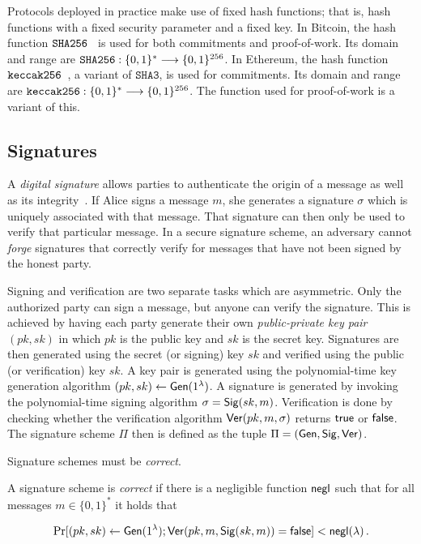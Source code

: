 Protocols deployed in practice make use of fixed hash functions; that is, hash
functions with a fixed security parameter and a fixed key. In Bitcoin, the hash
function $\mathtt{SHA256}$~\cite{sha256} is used for both commitments and proof-of-work.
Its domain and range are
$\mathtt{SHA256}: \{0, 1\}^* \longrightarrow \{0, 1\}^{256}$. In Ethereum, the hash
function $\mathtt{keccak256}$~\cite{bertoni2008indifferentiability}, a variant of
$\texttt{SHA3}$, is used for commitments. Its domain and range are $\mathtt{keccak256}: \{0, 1\}^*
\longrightarrow \{0, 1\}^{256}$. The function used for proof-of-work is a
variant of this.

\subsection{Signatures}
A \emph{digital signature} allows parties to authenticate the origin of a
message as well as its integrity~\cite{katz}. If Alice signs a message $m$, she generates a
signature $\sigma$ which is uniquely associated with that message. That
signature can then only be used to verify that particular message. In a secure signature scheme, an adversary
cannot \emph{forge} signatures that correctly verify for messages that have not
been signed by the honest party.

Signing and verification are two separate tasks which are asymmetric. Only the
authorized party can sign a message, but anyone can verify the signature. This
is achieved by having each party generate their own \emph{public-private
key pair} $(pk, sk)$ in which $pk$ is the public key and $sk$ is the secret key.
Signatures are then generated using the secret (or signing) key $sk$ and
verified using the public (or verification) key $sk$. A key pair is generated
using the polynomial-time key generation algorithm $(pk, sk) \gets
\mathsf{Gen}(1^\lambda)$. A signature is generated by invoking the polynomial-time
signing algorithm $\sigma = \mathsf{Sig}(sk, m)$. Verification is done by checking
whether the verification algorithm $\mathsf{Ver}(pk, m, \sigma)$ returns $\textsf{true}$ or
$\textsf{false}$. The signature scheme $\Pi$ then is defined as the tuple
$\Pi = (\mathsf{Gen}, \mathsf{Sig}, \mathsf{Ver})$.

Signature schemes must be \emph{correct}.

\begin{definition}
  A signature scheme is \emph{correct} if there is a
  negligible function $\mathsf{negl}$ such that for all messages $m \in \{0, 1\}^*$ it
  holds that

  \[
    \Pr[(pk, sk) \gets \mathsf{Gen}(1^\lambda); \mathsf{Ver}(pk, m, \mathsf{Sig}(sk, m)) = \textsf{false}] < \mathsf{negl}(\lambda)\,.
  \]
\end{definition}

